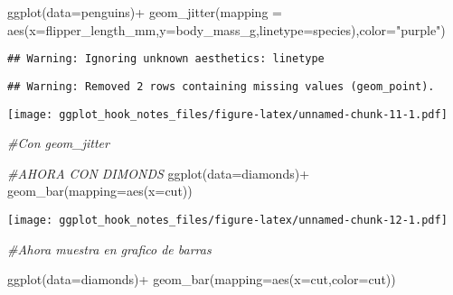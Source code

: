 \documentclass[
]{article}
\newenvironment{Shaded}{\begin{snugshade}}{\end{snugshade}}
\newcommand{\AttributeTok}[1]{\textcolor[rgb]{0.77,0.63,0.00}{#1}}
\newcommand{\CommentTok}[1]{\textcolor[rgb]{0.56,0.35,0.01}{\textit{#1}}}
\newcommand{\FunctionTok}[1]{\textcolor[rgb]{0.00,0.00,0.00}{#1}}
\newcommand{\NormalTok}[1]{#1}
\newcommand{\SpecialCharTok}[1]{\textcolor[rgb]{0.00,0.00,0.00}{#1}}
\newcommand{\StringTok}[1]{\textcolor[rgb]{0.31,0.60,0.02}{#1}}
\begin{document}
\begin{Shaded}
\begin{Highlighting}[]
\FunctionTok{ggplot}\NormalTok{(}\AttributeTok{data=}\NormalTok{penguins)}\SpecialCharTok{+}
  \FunctionTok{geom\_jitter}\NormalTok{(}\AttributeTok{mapping =} \FunctionTok{aes}\NormalTok{(}\AttributeTok{x=}\NormalTok{flipper\_length\_mm,}\AttributeTok{y=}\NormalTok{body\_mass\_g,}\AttributeTok{linetype=}\NormalTok{species),}\AttributeTok{color=}\StringTok{"purple"}\NormalTok{)}
\end{Highlighting}
\end{Shaded}

\begin{verbatim}
## Warning: Ignoring unknown aesthetics: linetype
\end{verbatim}

\begin{verbatim}
## Warning: Removed 2 rows containing missing values (geom_point).
\end{verbatim}

\texttt{[image: ggplot\_hook\_notes\_files/figure-latex/unnamed-chunk-11-1.pdf]}

\begin{Shaded}
\begin{Highlighting}[]
\CommentTok{\#Con geom\_jitter}
\end{Highlighting}
\end{Shaded}

\begin{Shaded}
\begin{Highlighting}[]
\CommentTok{\#AHORA CON DIMONDS}
\FunctionTok{ggplot}\NormalTok{(}\AttributeTok{data=}\NormalTok{diamonds)}\SpecialCharTok{+}
  \FunctionTok{geom\_bar}\NormalTok{(}\AttributeTok{mapping=}\FunctionTok{aes}\NormalTok{(}\AttributeTok{x=}\NormalTok{cut))}
\end{Highlighting}
\end{Shaded}

\texttt{[image: ggplot\_hook\_notes\_files/figure-latex/unnamed-chunk-12-1.pdf]}

\begin{Shaded}
\begin{Highlighting}[]
\CommentTok{\#Ahora muestra en grafico de barras}
\end{Highlighting}
\end{Shaded}

\begin{Shaded}
\begin{Highlighting}[]
\FunctionTok{ggplot}\NormalTok{(}\AttributeTok{data=}\NormalTok{diamonds)}\SpecialCharTok{+}
  \FunctionTok{geom\_bar}\NormalTok{(}\AttributeTok{mapping=}\FunctionTok{aes}\NormalTok{(}\AttributeTok{x=}\NormalTok{cut,}\AttributeTok{color=}\NormalTok{cut))}
\end{Highlighting}
\end{Shaded}
\end{document}
